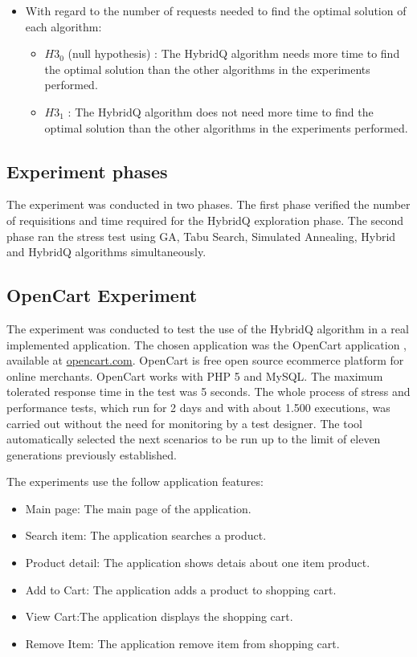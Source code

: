 \documentclass{report}
\begin{document}
\begin{itemize}
\item With regard to the number of requests needed to find the optimal solution of each algorithm:
\begin{itemize}
\item $H3_{0}$ (null hypothesis) : The HybridQ algorithm needs more time to find the optimal solution than the other algorithms in the experiments performed.
\item $H3_{1}$  : The HybridQ algorithm does not need more time to find the optimal solution than the other algorithms in the experiments performed.
\end{itemize}
\end{itemize}

\subsection{Experiment phases}

The experiment was conducted in two phases. The first phase verified the number of requisitions and time required for the HybridQ exploration phase. The second phase ran the stress test using GA, Tabu Search, Simulated Annealing, Hybrid and HybridQ algorithms simultaneously.

\subsection{OpenCart Experiment}

The experiment was conducted to test the use of the HybridQ algorithm in a real implemented application.  The chosen application was the OpenCart application , available at \url{opencart.com}. OpenCart is free open source ecommerce platform for online merchants. OpenCart works with PHP 5 and MySQL. The maximum tolerated response time in the test was 5 seconds. The whole process of stress and performance tests, which run for 2 days and  with about 1.500 executions, was carried out without the need for monitoring by a test designer. The tool automatically selected the next scenarios to be run up to the limit of eleven generations previously established. 

The experiments use the follow application features:

\begin{itemize}
\item Main page: The main page of the application.
\item Search item: The application searches a product.
\item Product detail: The application shows  detais about one item product.
\item Add to Cart: The application adds a product to shopping cart.
\item View Cart:The application displays the shopping cart.
\item Remove Item: The application remove item from shopping cart. 
\end{itemize}
\end{document}
